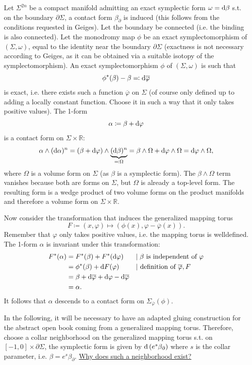 Let $\Sigma^{2n}$ be a compact manifold admitting an exact symplectic form $\omega = \mathrm{d} \beta$ s.t. on the boundary $\partial \Sigma$, a contact form $\beta_\partial$ is induced (this follows from the conditions requested in Geiges).
Let the boundary be connected (i.e. the binding is also connected).
Let the monodromy map $\phi$ be an exact symplectomorphism of $(\Sigma, \omega)$,
equal to the identity near the boundary $\partial \Sigma$ (exactness is not necessary according to Geiges, as it can be obtained via a suitable isotopy of the symplectomorphism).
An exact symplectomorphism $\phi$ of $(\Sigma, \omega)$ is such that
\[
    \phi^*(\beta) - \beta \eqqcolon \mathrm{d} \overline{\varphi}  
\]
is exact, i.e. there exists such a function $\overline{\varphi}$ on $\Sigma$ (of course only defined up to adding a locally constant function. Choose it in such a way that it only takes positive values).
The 1-form 
\[
    \alpha \coloneqq \beta + \mathrm{d} \varphi
\]
is a contact form on $\Sigma \times \mathbb R$:
\[
    \alpha \wedge (\mathrm{d} \alpha)^{n} = (\beta + \mathrm{d} \varphi)\wedge \underbrace{(\mathrm{d} \beta)^n}_{\eqqcolon \Omega} = \beta \wedge \Omega + \mathrm{d} \varphi \wedge \Omega = \mathrm{d} \varphi \wedge \Omega,
\]
where $\Omega$ is a volume form on $\Sigma$ (as $\beta$ is a symplectic form).
The $\beta \wedge \Omega$ term vanishes because both are forms on $\Sigma$, but $\Omega$ is already a top-level form.
The resulting form is a wedge product of two volume forms on the product manifolds and therefore a volume form on $\Sigma \times \mathbb R$.

Now consider the transformation that induces the generalized mapping torus
\[
    F \coloneqq (x,\varphi) \mapsto (\phi(x), \varphi - \overline{\varphi}(x)).    
\]
Remember that $\varphi$ only takes positive values, i.e. the mapping torus is welldefined.
The 1-form $\alpha$ is invariant under this transformation:
\begin{align*}
    F^*(\alpha) &= F^*(\beta) + F^*(\mathrm{d} \varphi)&&|\;\beta\text{ is independent of }\varphi\\
    &= \phi^*(\beta) + \mathrm{d} F(\varphi)&&|\text{ definition of }\overline{\varphi}, F\\
    &= \beta + \mathrm{d}\overline{\varphi} + \mathrm{d} \varphi - \mathrm{d} \overline{\varphi}\\
    &= \alpha.
\end{align*}
It follows that $\alpha$ descends to a contact form on $\Sigma_{\overline{\varphi}}(\phi)$. 

In the following, it will be necessary to have an adapted gluing construction for the abstract open book coming from a generalized mapping torus.
Therefore, choose a collar neighborhood on the generalized mapping torus s.t. on $[-1,0] \times \partial \Sigma$, 
the symplectic form is given by $\mathrm{d} \left(e^s\beta_\partial\right)$ where $s$ is the collar parameter, i.e. $\beta = e^s\beta_\partial$.
\underline{Why does such a neighborhood exist?}

